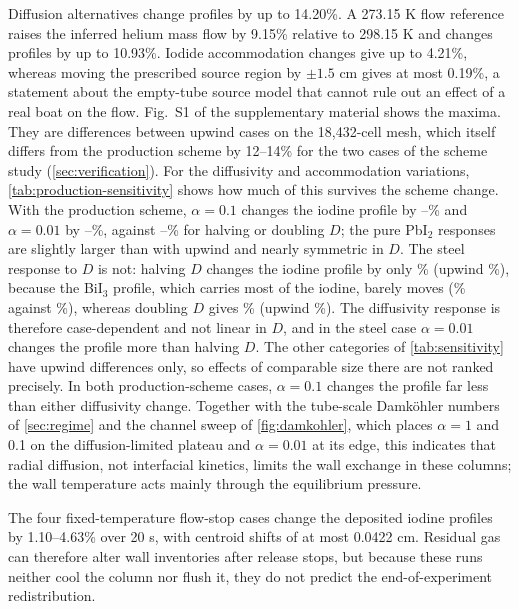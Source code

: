 Diffusion alternatives change profiles by up to 14.20\%. A 273.15 K flow
reference raises the inferred helium mass flow by 9.15\% relative to
298.15 K and changes profiles by up to 10.93\%. Iodide accommodation
changes give up to 4.21\%, whereas moving the prescribed source region
by $\pm1.5$ cm gives at most 0.19\%, a statement about the empty-tube
source model that cannot rule out an effect of a real boat on the flow.
Fig.~S1 of the supplementary material shows the maxima. They are differences between
upwind cases on the 18,432-cell mesh, which itself differs from the
production scheme by 12--14\% for the two cases of the scheme study
(\cref{sec:verification}). For the diffusivity and accommodation
variations, \cref{tab:production-sensitivity} shows how much of this
survives the scheme change. With the production scheme, $\alpha=0.1$
changes the iodine profile by \PSAlphaOneMin--\PSAlphaOneMax\% and
$\alpha=0.01$ by \PSAlphaTwoMin--\PSAlphaTwoMax\%, against
\PSDMin--\PSDMax\% for halving or doubling $D$; the pure PbI$_2$
responses are slightly larger than with upwind and nearly symmetric in
$D$. The steel response to $D$ is not: halving $D$ changes the iodine
profile by only \PSSteelHalf\% (upwind \PSSteelHalfUp\%), because the
BiI$_3$ profile, which carries most of the iodine, barely moves
(\PSSteelHalfBiI\% against \PSSteelHalfBiIUp\%), whereas doubling $D$
gives \PSSteelDouble\% (upwind \PSSteelDoubleUp\%). The diffusivity
response is therefore case-dependent and not linear in $D$, and in the
steel case $\alpha=0.01$ changes the profile more than halving $D$. The
other categories of \cref{tab:sensitivity} have upwind differences
only, so effects of comparable size there are not ranked precisely.
In both production-scheme cases, $\alpha=0.1$ changes the profile far
less than either diffusivity change. Together with the tube-scale
Damk\"ohler numbers of \cref{sec:regime} and the channel sweep of
\cref{fig:damkohler}, which places $\alpha=1$ and 0.1 on the
diffusion-limited plateau and $\alpha=0.01$ at its edge, this indicates
that radial diffusion, not interfacial kinetics, limits the wall
exchange in these columns; the wall temperature acts mainly through the
equilibrium pressure.

The four fixed-temperature flow-stop cases change the deposited iodine
profiles by 1.10--4.63\% over 20 s, with centroid shifts of at most
0.0422 cm. Residual gas can therefore alter wall inventories after
release stops, but because these runs neither cool the column nor flush
it, they do not predict the end-of-experiment redistribution.
